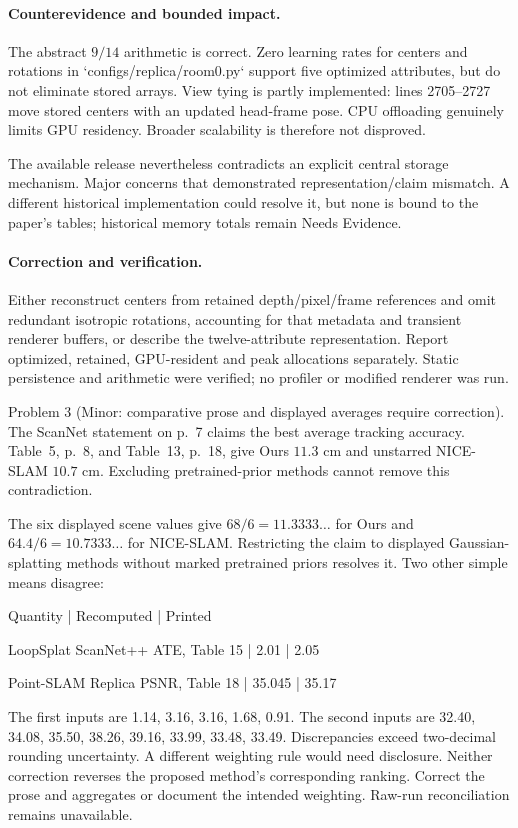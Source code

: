 \documentclass[10pt]{article}
\begin{document}
\paragraph*{Counterevidence and bounded impact.}\mbox{}\par
The abstract \(9/14\) arithmetic is correct. Zero learning rates for centers and rotations in `configs/replica/room0.py` support five optimized attributes, but do not eliminate stored arrays. View tying is partly implemented: lines 2705–2727 move stored centers with an updated head-frame pose. CPU offloading genuinely limits GPU residency. Broader scalability is therefore not disproved.\par
The available release nevertheless contradicts an explicit central storage mechanism. Major concerns that demonstrated representation/claim mismatch. A different historical implementation could resolve it, but none is bound to the paper’s tables; historical memory totals remain Needs Evidence.\par
\paragraph*{Correction and verification.}\mbox{}\par
Either reconstruct centers from retained depth/pixel/frame references and omit redundant isotropic rotations, accounting for that metadata and transient renderer buffers, or describe the twelve-attribute representation. Report optimized, retained, GPU-resident and peak allocations separately. Static persistence and arithmetic were verified; no profiler or modified renderer was run.\par
Problem 3 (Minor: comparative prose and displayed averages require correction).  The ScanNet statement on p. 7 claims the best average tracking accuracy. Table 5, p. 8, and Table 13, p. 18, give Ours \(11.3\) cm and unstarred NICE-SLAM \(10.7\) cm. Excluding pretrained-prior methods cannot remove this contradiction.\par
The six displayed scene values give \(68/6=11.3333\ldots\) for Ours and \(64.4/6=10.7333\ldots\) for NICE-SLAM. Restricting the claim to displayed Gaussian-splatting methods without marked pretrained priors resolves it. Two other simple means disagree:\par
Quantity | Recomputed | Printed\par
LoopSplat ScanNet++ ATE, Table 15 | 2.01 | 2.05\par
Point-SLAM Replica PSNR, Table 18 | 35.045 | 35.17\par
The first inputs are 1.14, 3.16, 3.16, 1.68, 0.91. The second inputs are 32.40, 34.08, 35.50, 38.26, 39.16, 33.99, 33.48, 33.49. Discrepancies exceed two-decimal rounding uncertainty. A different weighting rule would need disclosure. Neither correction reverses the proposed method’s corresponding ranking. Correct the prose and aggregates or document the intended weighting. Raw-run reconciliation remains unavailable.\par
\end{document}
